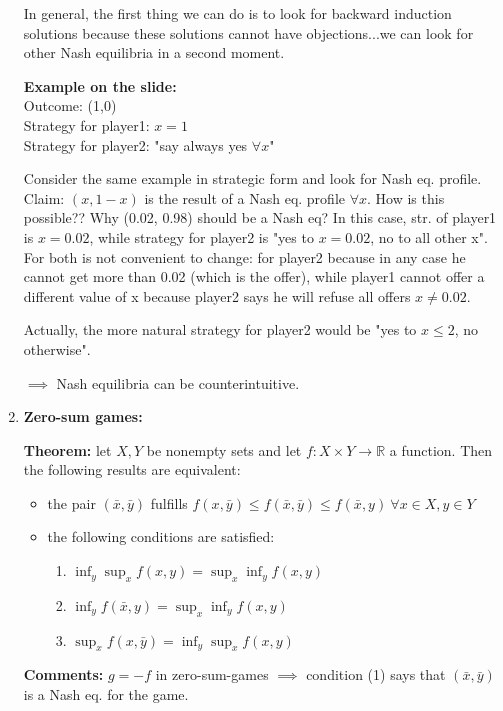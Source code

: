 \begin{enumerate}
	\noindent In general, the first thing we can do is to look for backward 
	induction solutions because these solutions cannot have objections...we 
	can look for other Nash equilibria in a second moment.
	
	\noindent \textbf{Example on the slide:}\\
	Outcome: (1,0)\\
	Strategy for player1: $x=1$\\
	Strategy for player2: "say always yes $\forall x$"
	
	\noindent Consider the same example in strategic form and look for Nash 
	eq. profile. Claim: $(x,1-x)$ is the result of a Nash eq. profile 
	$\forall x$. How is this possible?? Why (0.02, 0.98) should be a Nash eq? 
	In this case, str. of player1 is $x=0.02$, while strategy for player2 is 
	"yes to $x=0.02$, no to all other x". For both is not convenient to change: 
	for player2 because in any case he cannot get more than 0.02 (which is 
	the offer), while player1 cannot offer a different value of x because 
	player2 says he will refuse all offers $x\neq 0.02$.
	
	\noindent Actually, the more natural strategy for player2 would be 
	"yes to $x \leq 2$, no otherwise".
	
	\noindent $\implies$ Nash equilibria can be counterintuitive.
	
	\item \textbf{Zero-sum games:}
	
	\noindent \textbf{Theorem:} let $X,Y$ be nonempty sets and let 
	$f: X \times Y \rightarrow \mathbb{R}$ a function. Then the following 
	results are equivalent:
	\begin{itemize}
		\item the pair $(\bar{x},\bar{y})$ fulfills 
		$f(x,\bar{y}) \leq f(\bar{x},\bar{y}) \leq f(\bar{x},y) ~\forall x \in X, y \in Y$
		
		\item the following conditions are satisfied:
		\begin{enumerate}
			\item $\inf_y\sup_xf(x,y) = \sup_x\inf_yf(x,y)$
			\item $\inf_yf(\bar{x},y) = \sup_x\inf_yf(x,y)$
			\item $\sup_xf(x,\bar{y}) = \inf_y\sup_xf(x,y)$
		\end{enumerate}
	\end{itemize}
	\noindent \textbf{Comments:} $g=-f$ in zero-sum-games $\implies$ 
	condition (1) says that $(\bar{x},\bar{y})$ is a Nash eq. for the game.


\end{enumerate}

